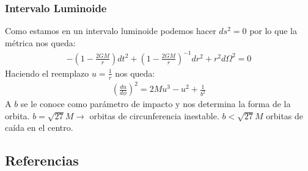 \documentclass{beamer}
\begin{document}


\begin{frame}
\frametitle{Intervalo Luminoide}
Como estamos en un intervalo luminoide podemos hacer $ ds^2 = 0  $ por lo que la métrica nos queda: 
\begin{gather*}
  - \left(1 - \frac{2GM }{r }\right)dt^2 + \left(1 - \frac{2GM }{r}\right) ^ {-1 } dr^2 + r^2 d \Omega^2 = 0 
\end{gather*}
Haciendo el reemplazo $ u = \frac{1}{r} $ nos queda: 
\begin{gather*}
  \left(\frac{d u  }{d \phi }\right)^2 = 2M u^3 - u^2 + \frac{1}{b^2 } 
\end{gather*}
A $ b  $ se le conoce como parámetro de impacto y nos determina la forma de la orbita. $ b = \sqrt{27 } M  \rightarrow $ orbitas de circunferencia inestable. $ b < \sqrt{27 } M  $ orbitas de caída en el centro.
\end{frame}




\begin{frame}
  \section{Referencias}
  \nocite{*}

  
  
\end{frame}
\end{document}
